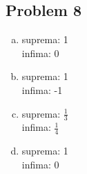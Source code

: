 \documentclass[12pt]{article}
\begin{document}
\subsection*{Problem 8}
\begin{enumerate}[a).]
    \item {
        suprema: 1\\
        infima: 0
    }
    \item {
        suprema: 1\\
        infima: -1 
    }
    \item {
        suprema: $\frac{1}{3}$\\
        infima: $\frac{1}{4}$
    }
    \item {
        suprema: 1\\
        infima: 0
    }
\end{enumerate}
\end{document}
